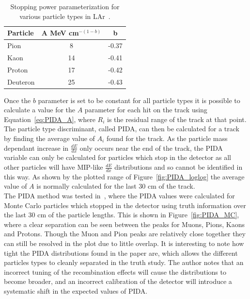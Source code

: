 \begin{table}
\caption[Stopping power parameterization for various particle types in liquid Argon]
        {Stopping power parameterization for various particle types in LAr~\citep{PIDA_Paper}.}
\centering
\label{tab:PIDAVals}
\begin{tabular}{l c c}
\toprule
{Particle} & {A MeV cm$^{-(1-b)}$} & {b} \\ 
\midrule
Pion     & 8  & -0.37 \\

Kaon     & 14 & -0.41 \\

Proton   & 17 & -0.42 \\

Deuteron & 25 & -0.43 \\
\bottomrule
\end{tabular}
\end{table}

Once the $b$ parameter is set to be constant for all particle types it is possible to calculate a value for the $A$ parameter for each hit on the track using Equation~\ref{eq:PIDA_A}, where $R_i$ is the residual range of the track at that point. The particle type discriminant, called PIDA, can then be calculated for a track by finding the average value of $A_i$ found for the track. As the particle mass dependant increase in $\frac{dE}{dx}$ only occurs near the end of the track, the PIDA variable can only be calculated for particles which stop in the detector as all other particles will have MIP-like $\frac{dE}{dx}$ distributions and so cannot be identified in this way. As shown by the plotted range of Figure~\ref{fig:PIDA_loglog} the average value of $A$ is normally calculated for the last 30 cm of the track. \\

The PIDA method was tested in~\citep{PIDA_Paper}, where the PIDA values were calculated for Monte Carlo particles which stopped in the detector using truth information over the last 30 cm of the particle lengths. This is shown in Figure~\ref{fig:PIDA_MC}, where a clear separation can be seen between the peaks for Muons, Pions, Kaons and Protons. Though the Muon and Pion peaks are relatively close together they can still be resolved in the plot due to little overlap. It is interesting to note how tight the PIDA distributions found in the paper are, which allows the different particles types to cleanly separated in the truth study. The author notes that an incorrect tuning of the recombination effects will cause the distributions to become broader, and an incorrect calibration of the detector will introduce a systematic shift in the expected values of PIDA. \\

